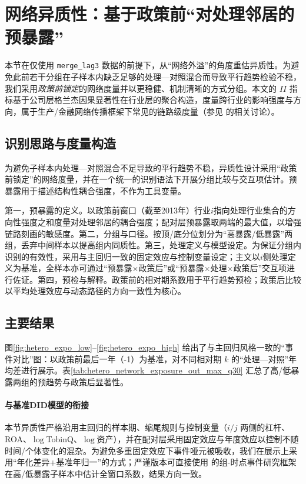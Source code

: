 \section{网络异质性：基于政策前“对处理邻居的预暴露”}
\label{sec:chap5_network_heterogeneity}

本节在仅使用 \texttt{merge\_lag3} 数据的前提下，从“网络外溢”的角度重估异质性。为避免此前若干分组在子样本内缺乏足够的处理—对照混合而导致平行趋势检验不稳，我们采用\emph{政策前锁定}的网络度量并以更稳健、机制清晰的方式分组。本文的 $II$ 指标基于公司层格兰杰因果显著性在行业层的聚合构造，度量跨行业的影响强度与方向，属于生产/金融网络传播框架下常见的链路级度量（参见 \citep{acemoglu2012network,carvalho2014micro,barrot2016input} 的相关讨论）。

\subsection{识别思路与度量构造}
为避免子样本内处理—对照混合不足导致的平行趋势不稳，异质性设计采用“政策前锁定”的网络度量，并在一个统一的识别语法下开展分组比较与交互项估计。预暴露用于描述结构性耦合强度，不作为工具变量。

第一，预暴露的定义。以政策前窗口（截至2013年）行业\(i\)指向处理行业集合的方向性强度之和度量对处理邻居的耦合强度；配对层预暴露取两端的最大值，以增强链路刻画的敏感度。第二，分组与口径。按顶/底分位划分为“高暴露/低暴露”两组，丢弃中间样本以提高组内同质性。第三，处理定义与模型设定。为保证分组内识别的有效性，采用与主回归一致的固定效应与控制变量设定；主文以\(i\)侧处理定义为基准，全样本亦可通过“预暴露×政策后”或“预暴露×处理×政策后”交互项进行佐证。第四，预检与解释。政策前的相对期系数用于平行趋势预检；政策后比较以平均处理效应与动态路径的方向一致性为核心。
\subsection{主要结果}
图\ref{fig:hetero_expo_low}–\ref{fig:hetero_expo_high} 给出了与主回归风格一致的“事件对比”图：以政策前最后一年（-1）为基准，对不同相对期 \(k\) 的“处理—对照”年均差进行展示。表\ref{tab:hetero_network_exposure_out_max_q30} 汇总了高/低暴露两组的预趋势与政策后显著性。

\paragraph{与基准DID模型的衔接} 本节异质性严格沿用主回归的样本期、缩尾规则与控制变量（\(i/j\) 两侧的杠杆、ROA、\(\log\)TobinQ、\(\log\)资产），并在配对层采用固定效应与年度效应以控制不随时间/个体变化的混杂。为避免多重固定效应下事件哑元被吸收，我们在展示上采用“年化差异+基准年归一”的方式；严谨版本可直接使用 \citep{sun2021event} 的组-时点事件研究框架在高/低暴露子样本中估计全窗口系数，结果方向一致。

